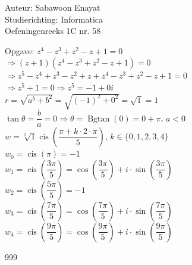 \documentclass[a4paper]{article}
\begin{document}
  
\noindent \large Auteur: Sabawoon Enayat \\
\noindent \large Studierichting: Informatica\\
\noindent \large Oefeningenreeks 1C nr. 58 \\

\newcommand{\Bgtan}{\operatorname{Bgtan}}
\newcommand{\cis}{\operatorname{cis}}

\medskip

\normalsize

Opgave: $z^4 - z^3 + z^2 - z + 1 = 0$\\

$\Rightarrow (z + 1)\left(z^4 - z^3 + z^2 - z + 1\right) = 0$\\

$\Rightarrow z^5 - z^4 + z^3 - z^2 + z + z^4 - z^3 + z^2 - z + 1 = 0$\\

$\Rightarrow z^5 + 1 = 0 \Rightarrow z^5 = -1 + 0i$\\

$r = \sqrt{a^b + b^2} = \sqrt{(-1)^2 + 0^2} = \sqrt{1} = 1$\\

$\tan \theta = \dfrac{b}{a} = 0 \Rightarrow \theta = \Bgtan (0) = 0 + \pi$, $a < 0$\\

$w = \sqrt[5]{1} \cis \left(\dfrac{\pi + k \cdot 2 \cdot \pi}{5}\right)$, $k \in \{0, 1, 2, 3, 4\}$\\

$w_0 = \cis (\pi) = -1$\\

$w_1 = \cis \left(\dfrac{3\pi}{5}\right) = \cos \left(\dfrac{3\pi}{5}\right) + i \cdot \sin \left(\dfrac{3\pi}{5}\right)$\\

$w_2 = \cis \left(\dfrac{5\pi}{5}\right) = -1$\\

$w_3 = \cis \left(\dfrac{7\pi}{5}\right) = \cos \left(\dfrac{7\pi}{5}\right) + i \cdot \sin \left(\dfrac{7\pi}{5}\right)$\\

$w_4 = \cis \left(\dfrac{9\pi}{5}\right) = \cos \left(\dfrac{9\pi}{5}\right) + i \cdot \sin \left(\dfrac{9\pi}{5}\right)$\\

\begin{thebibliography}{999}
\end{thebibliography}
\end{document}
